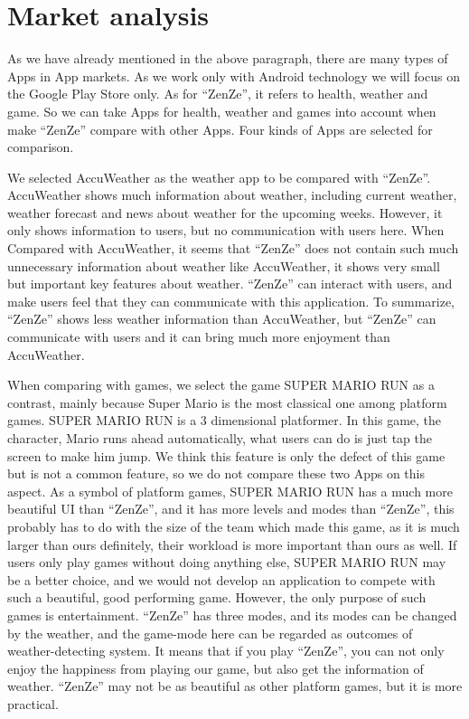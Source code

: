 \documentclass{sigchi}
\begin{document}
\section{Market analysis}
As we have already mentioned in the above paragraph, there are many types of Apps in App markets. As we work only with Android technology we will focus on the Google Play Store only. As for ``ZenZe'', it refers to health, weather and game. So we can take Apps for health, weather and games into account when make ``ZenZe'' compare with other Apps. Four kinds of Apps are selected for comparison.

We selected AccuWeather as the weather app to be compared with ``ZenZe''. AccuWeather shows much information about weather, including current weather, weather forecast and news about weather for the upcoming weeks. However, it only shows information to users, but no communication with users here. When Compared with AccuWeather, it seems that ``ZenZe'' does not contain such much unnecessary information about weather like AccuWeather, it shows very small but important key features about weather. ``ZenZe'' can interact with users, and make users feel that they can communicate with this application. To summarize, ``ZenZe'' shows less weather information than AccuWeather, but ``ZenZe'' can communicate with users and it can bring much more enjoyment than AccuWeather. 

When comparing with games, we select the game SUPER MARIO RUN as a contrast, mainly because Super Mario is the most classical one among platform games. SUPER MARIO RUN is a 3 dimensional platformer. In this game, the character, Mario runs ahead automatically, what users can do is just tap the screen to make him jump. We think this feature is only the defect of this game but is not a common feature, so we do not compare these two Apps on this aspect. As a symbol of platform games, SUPER MARIO RUN has a much more beautiful UI than ``ZenZe'', and it has more levels and modes than ``ZenZe'', this probably has to do with the size of the team which made this game, as it is much larger than ours definitely, their workload is more important than ours as well. If users only play games without doing anything else, SUPER MARIO RUN may be a better choice, and we would not develop an application to compete with such a beautiful, good performing game. However, the only purpose of such games is entertainment. ``ZenZe'' has three modes, and its modes can be changed by the weather, and the game-mode here can be regarded as outcomes of  weather-detecting system. It means that if you play ``ZenZe'', you can not only enjoy the happiness from playing our game, but also get the information of weather. ``ZenZe'' may not be as beautiful as other platform games, but it is more practical. 
\end{document}
